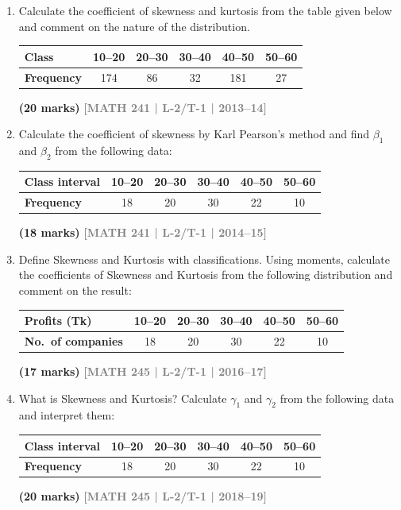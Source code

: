 \documentclass[12pt,a4paper]{article}
\newcommand{\yr}[1]{\hfill\textcolor{gray}{\small\textbf{[#1]}}}
\newcommand{\mk}[1]{\textcolor{orange!70!black}{\small\textbf{(#1 marks)}}}
\begin{document}
\begin{enumerate}
\item Calculate the coefficient of skewness and kurtosis from the table given below and comment on the nature of the distribution.
\begin{center}
\begin{tabular}{lccccc}
\toprule
\textbf{Class} & 10--20 & 20--30 & 30--40 & 40--50 & 50--60 \\
\midrule
\textbf{Frequency} & 174 & 86 & 32 & 181 & 27 \\
\bottomrule
\end{tabular}
\end{center}
\mk{20} \yr{MATH 241 | L-2/T-1 | 2013--14}

\item Calculate the coefficient of skewness by Karl Pearson's method and find $\beta_{1}$ and $\beta_{2}$ from the following data:
\begin{center}
\begin{tabular}{lccccc}
\toprule
\textbf{Class interval} & 10--20 & 20--30 & 30--40 & 40--50 & 50--60 \\
\midrule
\textbf{Frequency} & 18 & 20 & 30 & 22 & 10 \\
\bottomrule
\end{tabular}
\end{center}
\mk{18} \yr{MATH 241 | L-2/T-1 | 2014--15}

\item Define Skewness and Kurtosis with classifications. Using moments, calculate the coefficients of Skewness and Kurtosis from the following distribution and comment on the result:
\begin{center}
\begin{tabular}{lccccc}
\toprule
\textbf{Profits (Tk)} & 10--20 & 20--30 & 30--40 & 40--50 & 50--60 \\
\midrule
\textbf{No.\ of companies} & 18 & 20 & 30 & 22 & 10 \\
\bottomrule
\end{tabular}
\end{center}
\mk{17} \yr{MATH 245 | L-2/T-1 | 2016--17}

\item What is Skewness and Kurtosis? Calculate $\gamma_{1}$ and $\gamma_{2}$ from the following data and interpret them:
\begin{center}
\begin{tabular}{lccccc}
\toprule
\textbf{Class interval} & 10--20 & 20--30 & 30--40 & 40--50 & 50--60 \\
\midrule
\textbf{Frequency} & 18 & 20 & 30 & 22 & 10 \\
\bottomrule
\end{tabular}
\end{center}
\mk{20} \yr{MATH 245 | L-2/T-1 | 2018--19}


\end{enumerate}
\end{document}
